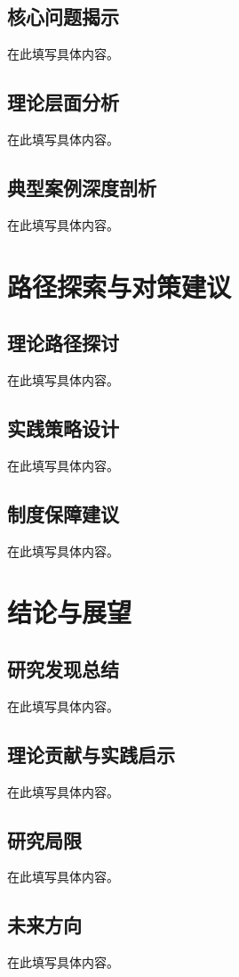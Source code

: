 \documentclass[a4paper,12pt,openright]{ctexrep}
\begin{document}
\section{核心问题揭示}
在此填写具体内容。

\section{理论层面分析}
在此填写具体内容。

\section{典型案例深度剖析}
在此填写具体内容。


\chapter{路径探索与对策建议}
\section{理论路径探讨}
在此填写具体内容。

\section{实践策略设计}
在此填写具体内容。

\section{制度保障建议}
在此填写具体内容。


\chapter{结论与展望}
\section{研究发现总结}
在此填写具体内容。

\section{理论贡献与实践启示}
在此填写具体内容。

\section{研究局限}
在此填写具体内容。

\section{未来方向}
在此填写具体内容。
\end{document}
